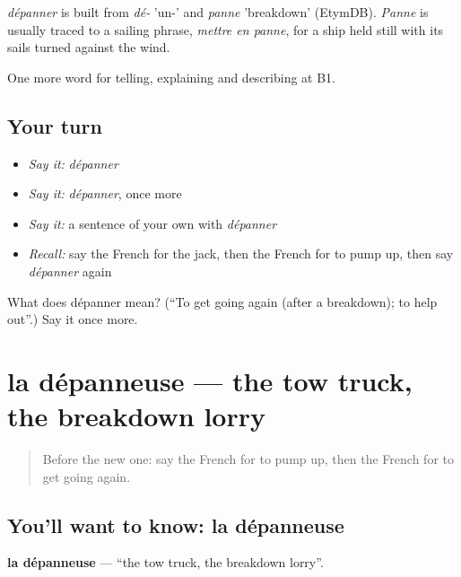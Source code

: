\begin{cousinweb}
\emph{dépanner} is built from \emph{dé-} 'un-' and \emph{panne} 'breakdown' (EtymDB). \emph{Panne} is usually traced to a sailing phrase, \emph{mettre en panne}, for a ship held still with its sails turned against the wind.
\end{cousinweb}

\begin{grammarlens}[title={What you've built}]
One more word for telling, explaining and describing at B1.
\end{grammarlens}

\subsection*{Your turn}
\begin{itemize}
\raggedright
  \item \emph{Say it:} \emph{dépanner}
  \item \emph{Say it:} \emph{dépanner}, once more
  \item \emph{Say it:} a sentence of your own with \emph{dépanner}
  \item \emph{Recall:} say the French for the jack, then the French for to pump up, then say \emph{dépanner} again
\end{itemize}

\begin{tcolorbox}[breakable,colback=teal!4,colframe=teal!35!black,title={Before you move on}]
What does dépanner mean? (\textquotedblleft{}To get going again (after a breakdown); to help out\textquotedblright{}.) Say it once more.
\end{tcolorbox}
\section[la dépanneuse]{la dépanneuse — the tow truck, the breakdown lorry}

\label{lesson:FR-C405-depanneuse}



\begin{quote}
Before the new one: say the French for to pump up, then the French for to get going again.
\end{quote}

\subsection*{You'll want to know: la dépanneuse}
\textbf{la dépanneuse} — \textquotedblleft{}the tow truck, the breakdown lorry\textquotedblright{}.

